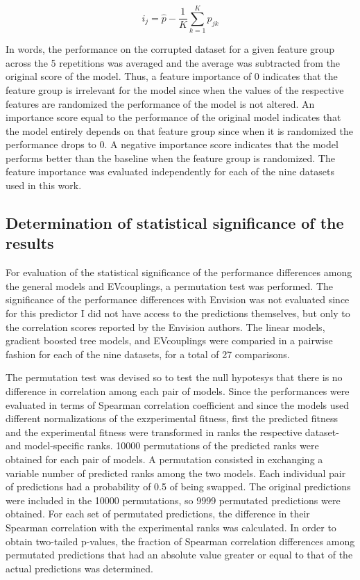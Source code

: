 \begin{equation}\label{eq:permutation_importance}
	i_j = \hat{p} - \frac{1}{K} \sum_{k=1}^K p_{jk}
\end{equation}

In words, the performance on the corrupted dataset for a given feature group across the \num{5} repetitions was averaged and the average was subtracted from the original score of the model.
Thus, a feature importance of \num{0} indicates that the feature group is irrelevant for the model since when the values of the respective features are randomized the performance of the model is not altered.
An importance score equal to the performance of the original model indicates that the model entirely depends on that feature group since when it is randomized the performance drops to \num{0}.
A negative importance score indicates that the model performs better than the baseline when the feature group is randomized.
The feature importance was evaluated independently for each of the nine datasets used in this work.

\subsection{Determination of statistical significance of the results}
For evaluation of the statistical significance of the performance differences among the general models and EVcouplings, a permutation test was performed.
The significance of the performance differences with Envision was not evaluated since for this predictor I did not have access to the predictions themselves, but only to the correlation scores reported by the Envision authors.
The linear models, gradient boosted tree models, and EVcouplings were comparied in a pairwise fashion for each of the nine datasets, for a total of \num{27} comparisons.

The permutation test was devised so to test the null hypotesys that there is no difference in correlation among each pair of models.
Since the performances were evaluated in terms of Spearman correlation coefficient and since the models used different normalizations of the exzperimental fitness, first the predicted fitness and the experimental fitness were transformed in ranks the respective dataset- and model-specific ranks.
\num{10000} permutations of the predicted ranks were obtained for each pair of models.
A permutation consisted in exchanging a variable number of predicted ranks among the two models.
Each individual pair of predictions had a probability of 0.5 of being swapped.
The original predictions were included in the \num{10000} permutations, so \num{9999} permutated predictions were obtained.
For each set of permutated predictions, the difference in their Spearman correlation with the experimental ranks was calculated.
In order to obtain two-tailed p-values, the fraction of Spearman correlation differences among permutated predictions that had an absolute value greater or equal to that of the actual predictions was determined.

